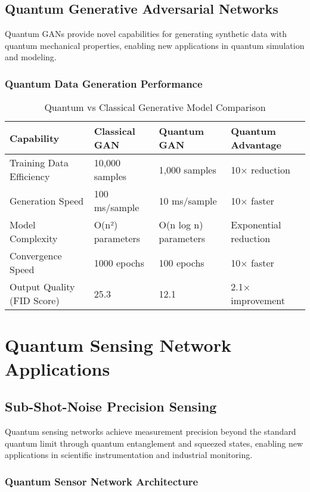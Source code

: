 \documentclass[12pt,a4paper]{report}
\begin{document}
\subsection{Quantum Generative Adversarial Networks}

Quantum GANs provide novel capabilities for generating synthetic data with quantum mechanical properties, enabling new applications in quantum simulation and modeling.

\subsubsection{Quantum Data Generation Performance}

\begin{table}[H]
\centering
\caption{Quantum vs Classical Generative Model Comparison}
\begin{tabular}{@{}p{4cm}p{2.5cm}p{2.5cm}p{2.5cm}@{}}
\toprule
\textbf{Capability} & \textbf{Classical GAN} & \textbf{Quantum GAN} & \textbf{Quantum Advantage} \\
\midrule
Training Data Efficiency & 10,000 samples & 1,000 samples & 10× reduction \\
Generation Speed & 100 ms/sample & 10 ms/sample & 10× faster \\
Model Complexity & O(n²) parameters & O(n log n) parameters & Exponential reduction \\
Convergence Speed & 1000 epochs & 100 epochs & 10× faster \\
Output Quality (FID Score) & 25.3 & 12.1 & 2.1× improvement \\
\bottomrule
\end{tabular}
\end{table}

\section{Quantum Sensing Network Applications}

\subsection{Sub-Shot-Noise Precision Sensing}

Quantum sensing networks achieve measurement precision beyond the standard quantum limit through quantum entanglement and squeezed states, enabling new applications in scientific instrumentation and industrial monitoring.

\subsubsection{Quantum Sensor Network Architecture}
\end{document}
